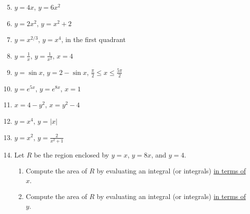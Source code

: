 \documentclass[12pt]{article}
\newif\ifans
\begin{document}
\begin{enumerate}
\setcounter{enumi}{4}

\item $y=4x$, $y=6x^2$

\ifans{\fbox{$\frac{8}{27}$}} \fi

\item $y=2x^2$, $y=x^2+2$

\ifans{\fbox{$\frac{8\sqrt{2}}{3}$}} \fi

\item $y=x^{2/3}$, $y=x^4$, in the first quadrant

\ifans{\fbox{$\frac{2}{5}$}} \fi

\item $y=\frac{1}{x}$, $y=\frac{1}{x^2}$, $x=4$

\ifans{\fbox{$-\frac{3}{4}+2\ln{2}$}} \fi

\item $y=\sin{x}$, $y=2-\sin{x}$, $\frac{\pi}{2}\leq x \leq \frac{5\pi}{2}$

\ifans{\fbox{$4\pi$}} \fi

\item $y=e^{5x}$, $y=e^{8x}$, $x=1$

\ifans{\fbox{$\frac{3}{40}+\frac{1}{8}e^{8}-\frac{1}{5}e^5$}} \fi

\item $x=4-y^2$, $x=y^2-4$

\ifans{\fbox{$\frac{64}{3}$}} \fi

\item $y=x^4$, $y=|x|$

\ifans{\fbox{$\frac{3}{5}$}} \fi

\item $y=x^2$, $y=\frac{2}{x^2+1}$

\ifans{\fbox{$\pi-\frac{2}{3}$}} \fi

\newpage

\item Let $R$ be the region enclosed by $y=x$, $y=8x$, and $y=4$.  

\begin{enumerate}

\item Compute the area of $R$ by evaluating an integral (or integrals) \underline{in terms of $x$}.

\ifans{\fbox{$\int_{0}^{\frac{1}{2}} 7x \,dx + \int_{\frac{1}{2}}^4 (4-x) \,dx= 7$}} \fi

\item Compute the area of $R$ by evaluating an integral (or integrals) \underline{in terms of $y$}.


\end{enumerate}
\end{enumerate}
\end{document}
